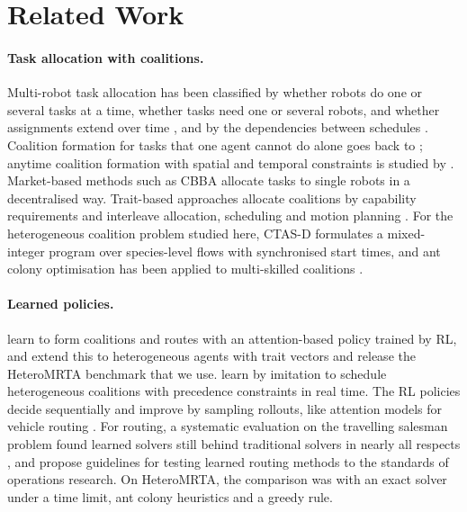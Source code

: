 \section{Related Work}
\label{sec:related}

\paragraph{Task allocation with coalitions.} Multi-robot task allocation has been classified by whether robots do
one or several tasks at a time, whether tasks need one or several robots, and whether assignments extend over time
\cite{gerkey2004formal}, and by the dependencies between schedules \cite{korsah2013comprehensive}. Coalition formation
for tasks that one agent cannot do alone goes back to \citet{shehory1998methods}; anytime coalition formation with
spatial and temporal constraints is studied by \citet{capezzuto2020anytime}. Market-based methods such as CBBA
\cite{choi2009consensus} allocate tasks to single robots in a decentralised way. Trait-based approaches allocate
coalitions by capability requirements and interleave allocation, scheduling and motion planning
\cite{neville2021interleaved,neville2023ditags}. For the heterogeneous coalition problem studied here, CTAS-D
\cite{fu2023robust} formulates a mixed-integer program over species-level flows with synchronised start times, and ant
colony optimisation has been applied to multi-skilled coalitions \cite{babincsak2023ant}.

\paragraph{Learned policies.} \citet{dai2024dynamic} learn to form coalitions and routes with an attention-based policy
trained by RL, and \citet{dai2025heterogeneous} extend this to heterogeneous agents with trait vectors and release
the HeteroMRTA benchmark that we use. \citet{bichler2025sadcher} learn by imitation to schedule heterogeneous
coalitions with precedence constraints in real time. The RL policies decide sequentially and improve by sampling rollouts, like
attention models for vehicle routing \cite{kool2019attention,kwon2020pomo}. For routing, a systematic evaluation on the
travelling salesman problem found learned solvers still behind traditional solvers in nearly all respects
\cite{liu2023how}, and \citet{accorsi2022guidelines} propose guidelines for testing learned routing methods to the
standards of operations research. On HeteroMRTA, the comparison was with an exact solver under a time limit, ant
colony heuristics and a greedy rule.

